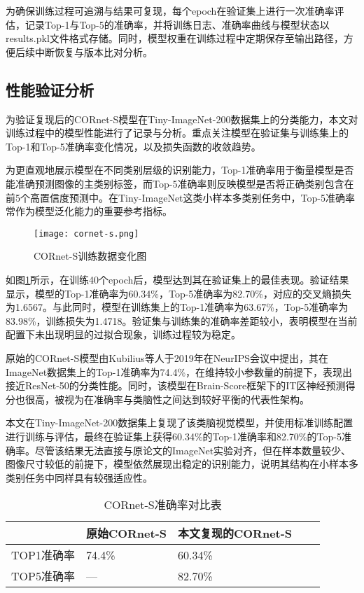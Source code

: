 为确保训练过程可追溯与结果可复现，每个epoch在验证集上进行一次准确率评估，记录Top-1与Top-5的准确率，并将训练日志、准确率曲线与模型状态以results.pkl文件格式存储。同时，模型权重在训练过程中定期保存至输出路径，方便后续中断恢复与版本比对分析。

\subsection{性能验证分析}

为验证复现后的CORnet-S模型在Tiny-ImageNet-200数据集上的分类能力，本文对训练过程中的模型性能进行了记录与分析。重点关注模型在验证集与训练集上的Top-1和Top-5准确率变化情况，以及损失函数的收敛趋势。

为更直观地展示模型在不同类别层级的识别能力，Top-1准确率用于衡量模型是否能准确预测图像的主类别标签，而Top-5准确率则反映模型是否将正确类别包含在前5个高置信度预测中。在Tiny-ImageNet这类小样本多类别任务中，Top-5准确率常作为模型泛化能力的重要参考指标。

\begin{figure}[hbt]
	\centering
	\texttt{[image: cornet-s.png]}
	\caption{CORnet-S训练数据变化图}
	\label{f.szxt}
\end{figure}

如图\ref{f.szxt}所示，在训练40个epoch后，模型达到其在验证集上的最佳表现。验证结果显示，模型的Top-1准确率为60.34\%，Top-5准确率为82.70\%，对应的交叉熵损失为1.6567。与此同时，模型在训练集上的Top-1准确率为63.67\%，Top-5准确率为83.98\%，训练损失为1.4718。验证集与训练集的准确率差距较小，表明模型在当前配置下未出现明显的过拟合现象，训练过程较为稳定。

原始的CORnet-S模型由Kubilius等人于2019年在NeurIPS会议中提出，其在ImageNet数据集上的Top-1准确率为74.4\%\cite{kubilius2019brain}，在维持较小参数量的前提下，表现出接近ResNet-50的分类性能。同时，该模型在Brain-Score框架下的IT区神经预测得分也很高，被视为在准确率与类脑性之间达到较好平衡的代表性架构。

本文在Tiny-ImageNet-200数据集上复现了该类脑视觉模型，并使用标准训练配置进行训练与评估，最终在验证集上获得60.34\%的Top-1准确率和82.70\%的Top-5准确率。尽管该结果无法直接与原论文的ImageNet实验对齐，但在样本数量较少、图像尺寸较低的前提下，模型依然展现出稳定的识别能力，说明其结构在小样本多类别任务中同样具有较强适应性。

\begin{table}[htb]
	\centering
	\caption{CORnet-S准确率对比表}
	\label{tab:CORnet-S}
	\begin{tabular}{lllll}
		\hline
		       & 原始CORnet-S & 本文复现的CORnet-S \\
		\hline
		TOP1准确率 & 74.4\% & 60.34\%   \\
		TOP5准确率 & — & 82.70\%    \\
		\hline
	\end{tabular}
\end{table}

